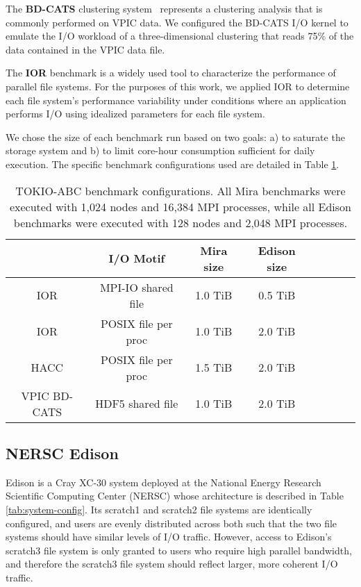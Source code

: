 The \textbf{BD-CATS} clustering system~\cite{Patwary2015} represents
a clustering analysis that is commonly performed on VPIC data.
We configured the BD-CATS I/O kernel to emulate the I/O workload of
a three-dimensional clustering that reads 75\% of the data
contained in the VPIC data file.

The \textbf{IOR} benchmark is a widely used tool
to characterize the performance of parallel file systems\cite{Yildiz2016,Xie2012,Lofstead2010,Uselton2010}.
For the purposes of this work, we applied IOR to determine each file system's performance variability under conditions where an application performs I/O using idealized parameters for each
file system.

We chose the size of each benchmark run based on two goals:
a) to saturate the storage system and
b) to limit core-hour consumption sufficient for daily execution.
The specific benchmark configurations used are detailed in Table \ref{tab:bench-config}.

\begin{table}[h]
\footnotesize
\centering
\begin{tabular}{|c|c|c|c|c|c|c|c|}
\hline
 & \textbf{I/O Motif} & \textbf{Mira size} & \textbf{Edison size} \\
\hline
IOR & MPI-IO shared file & 1.0 TiB & 0.5 TiB\\
\hline
IOR & POSIX file per proc & 1.0 TiB & 2.0 TiB\\
\hline
HACC & POSIX file per proc & 1.5 TiB & 2.0 TiB \\
\hline
VPIC BD-CATS & HDF5 shared file & 1.0 TiB & 2.0 TiB\\
\hline
\end{tabular}
\caption{TOKIO-ABC benchmark configurations. All Mira benchmarks were
executed with 1,024 nodes and 16,384 MPI processes, while all Edison
benchmarks were executed with 128 nodes and 2,048 MPI processes.}
\label{tab:bench-config}
\normalsize
\vspace{-.4in}
\end{table}


\subsection{NERSC Edison} \label{sec:platforms/edison}

Edison is a Cray XC-30 system deployed at the National Energy Research Scientific Computing Center (NERSC) whose architecture is described in Table \ref{tab:system-config}.
Its scratch1 and scratch2 file systems are identically configured, and users are evenly distributed across both such that the two file systems should have similar levels of I/O traffic.
However, access to Edison's scratch3 file system is only granted to users who require high parallel bandwidth, and therefore the scratch3 file system should reflect larger, more coherent I/O traffic.

